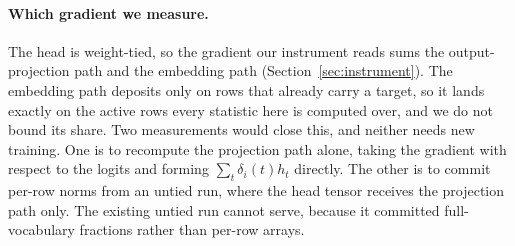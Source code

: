 \paragraph{Which gradient we measure.} The head is weight-tied, so the gradient our
instrument reads sums the output-projection path and the embedding path
(Section~\ref{sec:instrument}). The embedding path deposits only on rows that already
carry a target, so it lands exactly on the active rows every statistic here is
computed over, and we do not bound its share. Two measurements would close this, and neither needs new
training. One is to recompute the projection path alone, taking the gradient with
respect to the logits and forming $\sum_t \delta_i(t) h_t$ directly. The other is to
commit per-row norms from an untied run, where the head tensor receives the
projection path only. The existing untied run cannot serve, because it committed
full-vocabulary fractions rather than per-row arrays.

